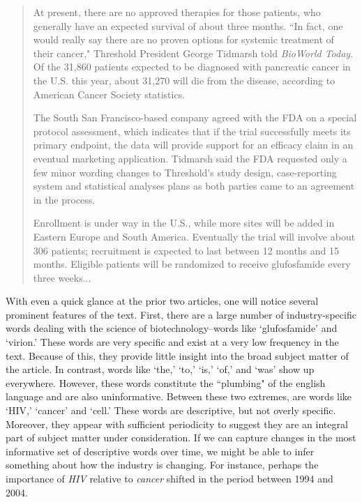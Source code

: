 \begin{singlespace}
\begin{small}
\begin{quotation}
At present, there are no approved therapies for those patients, who generally have an expected survival of about three months. ``In fact, one would really say there are no proven options for systemic treatment of their cancer," Threshold President George Tidmarsh told \emph{BioWorld Today}. Of the 31,860 patients expected to be diagnosed with pancreatic cancer in the U.S. this year, about 31,270 will die from the disease, according to American Cancer Society statistics.

The South San Francisco-based company agreed with the FDA on a special protocol assessment, which indicates that if the trial successfully meets its primary endpoint, the data will provide support for an efficacy claim in an eventual marketing application. Tidmarsh said the FDA requested only a few minor wording changes to Threshold's study design, case-reporting system and statistical analyses plans as both parties came to an agreement in the process.

Enrollment is under way in the U.S., while more sites will be added in Eastern Europe and South America. Eventually the trial will involve about 306 patients; recruitment is expected to last between 12 months and 15 months. Eligible patients will be randomized to receive glufosfamide every three weeks...
\end{quotation}
\end{small}
\end{singlespace}

With even a quick glance at the prior two articles, one will notice several prominent features of the text. First, there are a large number of industry-specific words dealing with the science of biotechnology--words like `glufosfamide' and `virion.' These words are very specific and exist at a very low frequency in the text. Because of this, they provide little insight into the broad subject matter of the article. In contrast, words like `the,' `to,' `is,' `of,' and `was' show up everywhere. However, these words constitute the ``plumbing" of the english language and are also uninformative. Between these two extremes, are words like `HIV,' `cancer' and `cell.' These words are descriptive, but not overly specific. Moreover, they appear with sufficient periodicity to suggest they are an integral part of subject matter under consideration. If we can capture changes in the most informative set of descriptive words over time, we might be able to infer something about how the industry is changing. For instance, perhaps the importance of \emph{HIV} relative to \emph{cancer} shifted in the period between 1994 and 2004.

